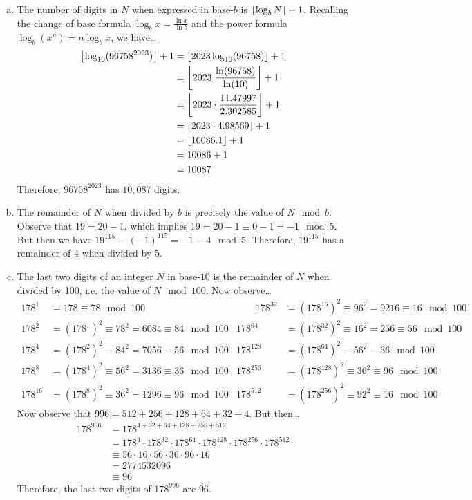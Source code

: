 \documentclass[11pt,letterpaper]{article}
\begin{document}
\sol 
\begin{enumerate}[(a)]
\item The number of digits in $N$ when expressed in base-$b$ is $\floor*{\log_b N} + 1$. Recalling the change of base formula $\log_b x= \frac{\ln x}{\ln b}$ and the power formula $\log_b(x^n)= n \log_b x$, we have\dots
	\[
	\begin{aligned}
	\floor*{\log_{10} (96758^{2023}) } + 1&= \floor*{2023 \log_{10} (96758) } + 1 \\
	&= \floor*{2023\; \dfrac{\ln(96758)}{\ln(10)} } + 1 \\
	&= \floor*{2023 \cdot \dfrac{11.47997}{2.302585}} + 1 \\
	&= \floor*{2023 \cdot 4.98569} + 1 \\
	&= \floor*{10086.1} + 1 \\
	&= 10086 + 1 \\
	&= 10087
	\end{aligned}
	\]
Therefore, $96758^{2023}$ has $10,\!087$ digits. \pspace

\item The remainder of $N$ when divided by $b$ is precisely the value of $N \mod b$. Observe that $19= 20 - 1$, which implies $19= 20 - 1 \equiv 0 - 1= -1 \mod 5$. But then we have $19^{115} \equiv (-1)^{115}= -1 \equiv 4 \mod 5$. Therefore, $19^{115}$ has a remainder of 4 when divided by 5. \pspace

\item The last two digits of an integer $N$ in base-$10$ is the remainder of $N$ when divided by 100, i.e. the value of $N \mod 100$. Now observe\dots
	\[
	\begin{aligned}
	178^1&= 178 \equiv 78 \mod 100 &\qquad 178^{32}&= (178^{16})^2 \equiv 96^2= 9216 \equiv 16 \mod 100 \\
	178^2&= (178^1)^2 \equiv 78^2= 6084 \equiv 84 \mod 100 & 178^{64}&= (178^{32})^2 \equiv 16^2= 256 \equiv 56 \mod 100 \\
	178^4&= (178^2)^2 \equiv 84^2= 7056 \equiv 56 \mod 100 & 178^{128}&= (178^{64})^2 \equiv 56^2 \equiv 36 \mod 100 \\
	178^8&= (178^4)^2 \equiv 56^2= 3136 \equiv 36 \mod 100 & 178^{256}&= (178^{128})^2 \equiv 36^2 \equiv 96 \mod 100 \\
	178^{16}&= (178^8)^2 \equiv 36^2= 1296 \equiv 96 \mod 100 & 178^{512}&= (178^{256})^2 \equiv 92^2 \equiv 16 \mod 100
	\end{aligned}
	\]
Now observe that $996= 512 + 256 + 128 + 64 + 32 + 4$. But then\dots
	\[
	\begin{aligned}
	178^{996}&= 178^{4 + 32 + 64 + 128 + 256 + 512} \\
	&= 178^4 \cdot 178^{32} \cdot 178^{64} \cdot 178^{128} \cdot 178^{256} \cdot 178^{512} \\
	&\equiv 56 \cdot 16 \cdot 56 \cdot 36 \cdot 96 \cdot 16 \\
	&= 2774532096 \\
	&\equiv 96
	\end{aligned}
	\]
Therefore, the last two digits of $178^{996}$ are $96$. 
\end{enumerate}
\end{document}
